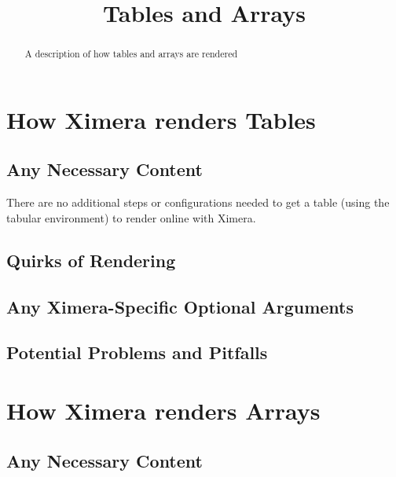 \documentclass{ximera}
\title{Tables and Arrays}
\begin{document}
\begin{abstract}
    A description of how tables and arrays are rendered
\end{abstract}
\maketitle


\section*{How Ximera renders Tables}
    \subsection*{Any Necessary Content}
        There are no additional steps or configurations needed to get a table (using the tabular environment) to render online with Ximera.
        
        
    \subsection*{Quirks of Rendering}
        
        
        
    \subsection*{Any Ximera-Specific Optional Arguments}
        
        
        
    \subsection*{Potential Problems and Pitfalls}
        
        
        
\section*{How Ximera renders Arrays}
    \subsection*{Any Necessary Content}
        
        
        
\end{document}

